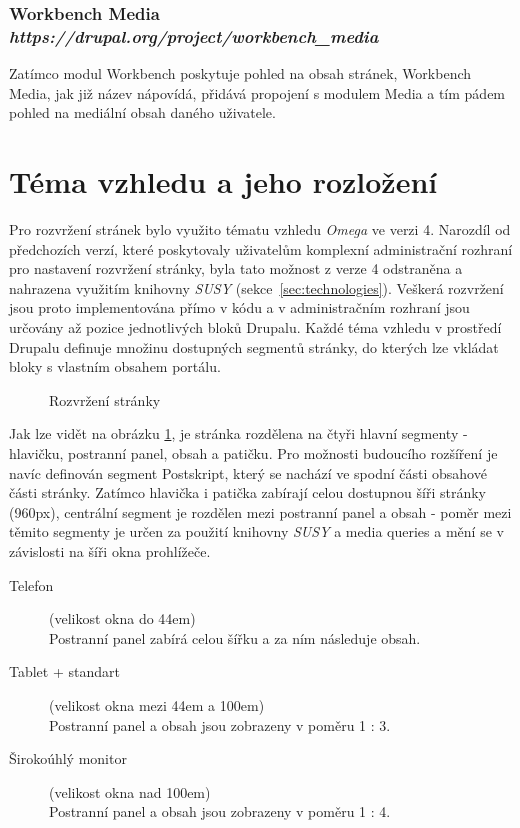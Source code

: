 \subsubsection*{Workbench Media \hfill \emph{https://drupal.org/project/workbench\_media}}
Zatímco modul Workbench poskytuje pohled na obsah stránek, Workbench Media, jak již název nápovídá, přidává propojení s modulem Media a tím pádem pohled na mediální obsah daného uživatele. 

\section{Téma vzhledu a jeho rozložení}
Pro rozvržení stránek bylo využito tématu vzhledu \emph{Omega} ve verzi 4. Narozdíl od předchozích verzí, které poskytovaly uživatelům komplexní administrační rozhraní pro nastavení rozvržení stránky, byla tato možnost z verze 4 odstraněna a nahrazena využitím knihovny \emph{SUSY} (sekce~\ref{sec:technologies}). Veškerá rozvržení jsou proto implementována přímo v kódu a v administračním rozhraní jsou určovány až pozice jednotlivých bloků Drupalu. Každé téma vzhledu v prostředí Drupalu definuje množinu dostupných segmentů stránky, do kterých lze vkládat bloky s vlastním obsahem portálu. 

\begin{figure}[htp] 
  \caption{Rozvržení stránky}
  \label{fig:rozvrzeni-stranky}
\end{figure}  

Jak lze vidět na obrázku \ref{fig:rozvrzeni-stranky}, je stránka rozdělena na čtyři hlavní segmenty - hlavičku, postranní panel, obsah a patičku. Pro možnosti budoucího rozšíření je navíc definován segment Postskript, který se nachází ve spodní části obsahové části stránky. Zatímco hlavička i patička zabírají celou dostupnou šíři stránky (960px), centrální segment je rozdělen mezi postranní panel a obsah - poměr mezi těmito segmenty je určen za použití knihovny \emph{SUSY} a media queries a mění se v závislosti na šíři okna prohlížeče. 

\begin{description}
  \item[Telefon] (velikost okna do 44em) \hfill \\
  Postranní panel zabírá celou šířku a za ním následuje obsah.
  \item[Tablet + standart] (velikost okna mezi 44em a 100em) \hfill \\
  Postranní panel a obsah jsou zobrazeny v poměru 1 : 3.
  \item[Širokoúhlý monitor] (velikost okna nad 100em) \hfill \\
  Postranní panel a obsah jsou zobrazeny v poměru 1 : 4.  
\end{description}

